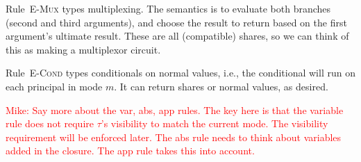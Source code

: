 \documentclass[10pt]{article}
\newcommand{\rulelab}[1]{{\small \textsc{#1}}}
\newcommand{\kw}[1]{\ensuremath{\mathtt{#1}}}
\newcommand{\isec}{\ensuremath{\mathtt{pmap}}}
\newcommand{\sectyp}[3]{\ensuremath{{#1} \{~{#2}:{#3}~\}}}
\newcommand{\epar}[2]{\ensuremath{\kw{par}~{#1}~{#2}}}
\newcommand{\econd}[3]{\ensuremath{\kw{if}~{#1}~\kw{then}~{#2}~\kw{else}~{#3}}}
\newcommand{\mwh}[1]{\textcolor{red}{Mike: #1}}
\begin{document}
Rule~\rulelab{E-Mux} types multiplexing. The semantics is to evaluate
both branches (second and third arguments), and choose the result to
return based on the first argument's ultimate result. These are all
(compatible) shares, so we can think of this as making a multiplexor
circuit. 

Rule~\rulelab{E-Cond} types conditionals on normal values, i.e., the
conditional will run on each principal in mode $m$. It can return
shares or normal values, as desired. 

\mwh{Say more about the var, abs, app rules. The key here is that the
  variable rule does not require $\tau$'s visibility to match the
  current mode. The visibility requirement will be enforced later. The
  abs rule needs to think about variables added in the closure. The
  app rule takes this into account.}

\end{document}
